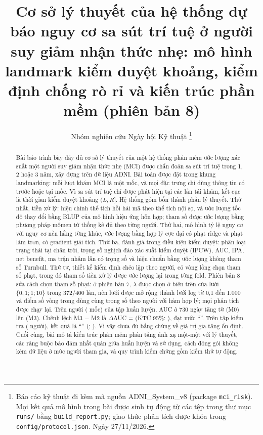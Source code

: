 \documentclass[journal]{IEEEtran}
\newcommand{\code}[1]{\texttt{#1}}
\begin{document}
\title{Cơ sở lý thuyết của hệ thống dự báo nguy cơ sa sút trí tuệ ở người suy giảm nhận thức nhẹ: mô hình landmark kiểm duyệt khoảng, kiểm định chống rò rỉ và kiến trúc phần mềm (phiên bản 8)}

\author{Nhóm nghiên cứu Ngày hội Kỹ thuật%
\thanks{Báo cáo kỹ thuật đi kèm mã nguồn ADNI\_System\_v8 (package \code{mci\_risk}). Mọi kết quả mô hình trong bài được sinh tự động từ các tệp trong thư mục \code{runs/} bằng \code{build\_report.py}; giao thức phân tích được khóa trong \code{config/protocol.json}. Ngày 27/11/2026.}}

\maketitle

\begin{abstract}
Bài báo trình bày đầy đủ cơ sở lý thuyết của một hệ thống phần mềm ước lượng xác suất một người suy giảm nhận thức nhẹ (MCI) được chẩn đoán sa sút trí tuệ trong 1, 2 hoặc 3 năm, xây dựng trên dữ liệu ADNI. Bài toán được đặt trong khung landmarking: mỗi lượt khám MCI là một mốc, và mọi đặc trưng chỉ dùng thông tin có trước hoặc tại mốc. Vì sa sút trí tuệ chỉ được phát hiện tại các lần tái khám, kết cục là thời gian kiểm duyệt khoảng $(L,R]$. Hệ thống gồm bốn thành phần lý thuyết. Thứ nhất, tiền xử lý: hiệu chỉnh thể tích hồi hải mã theo thể tích nội sọ, và ước lượng tốc độ thay đổi bằng BLUP của mô hình hiệu ứng hỗn hợp; tham số được ước lượng bằng phương pháp mômen từ thống kê đủ theo từng người. Thứ hai, mô hình tỷ lệ nguy cơ với nguy cơ nền hằng từng khúc, ước lượng bằng hợp lý cực đại có phạt ridge và phạt làm trơn, có gradient giải tích. Thứ ba, đánh giá trong điều kiện kiểm duyệt: phân loại trạng thái tại chân trời, trọng số nghịch đảo xác suất kiểm duyệt (IPCW), AUC, IPA, net benefit, ma trận nhầm lẫn có trọng số và hiệu chuẩn bằng ước lượng không tham số Turnbull. Thứ tư, thiết kế kiểm định chéo lặp theo người, có vòng lồng chọn tham số phạt, trong đó tham số tiền xử lý được ước lượng lại trong từng fold. Phiên bản 8 sửa cách chọn tham số phạt: ở phiên bản 7, $\lambda$ được chọn ở biên trên của lưới $\{0{,}1; 1; 10\}$ trong 372/400 lần, nên lưới được mở rộng thành lưới log từ 0,1 đến 1.000 và điểm số vòng trong dùng cùng trọng số theo người với hàm hợp lý; mọi phân tích được chạy lại. Trên  người ( mốc) của tập huấn luyện, AUC ở 730 ngày tăng từ  (M0) lên  (M3). Chênh lệch M3 − M2 là $\Delta$AUC =  (KTC 95\%: ), đạt mức ``''. Trên tập kiểm tra ( người), kết quả là ``'' (; ). Vì vậy chưa đủ bằng chứng về giá trị gia tăng ổn định. Cuối cùng, bài mô tả kiến trúc phần mềm phân tầng ánh xạ một-một với lý thuyết, các ràng buộc bảo đảm nhất quán giữa huấn luyện và sử dụng, cách đóng gói không kèm dữ liệu ở mức người tham gia, và quy trình kiểm chứng gồm  kiểm thử tự động.
\end{abstract}
\end{document}
